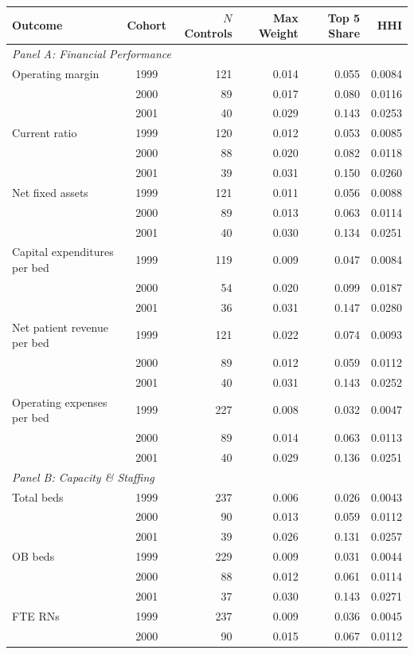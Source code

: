 \begin{tabular}{l c r r r r}
\toprule
Outcome & Cohort & $N$ Controls & Max Weight & Top 5 Share & HHI \\
\midrule
\multicolumn{6}{l}{\textit{Panel A: Financial Performance}} \\
Operating margin & 1999 & 121 & 0.014 & 0.055 & 0.0084 \\
 & 2000 & 89 & 0.017 & 0.080 & 0.0116 \\
 & 2001 & 40 & 0.029 & 0.143 & 0.0253 \\
Current ratio & 1999 & 120 & 0.012 & 0.053 & 0.0085 \\
 & 2000 & 88 & 0.020 & 0.082 & 0.0118 \\
 & 2001 & 39 & 0.031 & 0.150 & 0.0260 \\
Net fixed assets & 1999 & 121 & 0.011 & 0.056 & 0.0088 \\
 & 2000 & 89 & 0.013 & 0.063 & 0.0114 \\
 & 2001 & 40 & 0.030 & 0.134 & 0.0251 \\
Capital expenditures per bed & 1999 & 119 & 0.009 & 0.047 & 0.0084 \\
 & 2000 & 54 & 0.020 & 0.099 & 0.0187 \\
 & 2001 & 36 & 0.031 & 0.147 & 0.0280 \\
Net patient revenue per bed & 1999 & 121 & 0.022 & 0.074 & 0.0093 \\
 & 2000 & 89 & 0.012 & 0.059 & 0.0112 \\
 & 2001 & 40 & 0.031 & 0.143 & 0.0252 \\
Operating expenses per bed & 1999 & 227 & 0.008 & 0.032 & 0.0047 \\
 & 2000 & 89 & 0.014 & 0.063 & 0.0113 \\
 & 2001 & 40 & 0.029 & 0.136 & 0.0251 \\
\midrule
\multicolumn{6}{l}{\textit{Panel B: Capacity \& Staffing}} \\
Total beds & 1999 & 237 & 0.006 & 0.026 & 0.0043 \\
 & 2000 & 90 & 0.013 & 0.059 & 0.0112 \\
 & 2001 & 39 & 0.026 & 0.131 & 0.0257 \\
OB beds & 1999 & 229 & 0.009 & 0.031 & 0.0044 \\
 & 2000 & 88 & 0.012 & 0.061 & 0.0114 \\
 & 2001 & 37 & 0.030 & 0.143 & 0.0271 \\
FTE RNs & 1999 & 237 & 0.009 & 0.036 & 0.0045 \\
 & 2000 & 90 & 0.015 & 0.067 & 0.0112 \\

\end{tabular}
